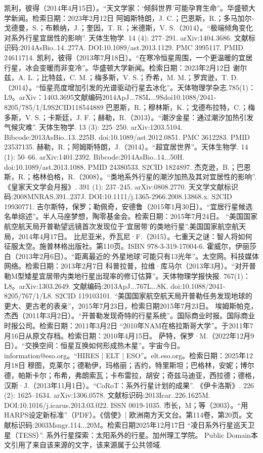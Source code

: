 \begin{enumerate}
 凯利，彼得（2014年4月15日）。“天文学家：‘倾斜世界’可能孕育生命”。华盛顿大学新闻。检索日期：2023年2月12日
 阿姆斯特朗，J. C.；巴恩斯，R.；多马加尔-戈德曼，S.；布赖纳，J.；奎因，T. R.；米德斯，V. S.（2014）。“极端倾角变化对系外行星宜居性的影响”. 天体生物学. 14 (4): 277–291. arXiv:1404.3686. 文献标识码:2014AsBio..14..277A. DOI:10.1089/ast.2013.1129. PMC 3995117. PMID 24611714.
 凯利，彼得（2013年7月18日）。“在寒冷恒星周围，一个更温暖的宜居行星，冰会变暖而非变冷”。华盛顿大学新闻。检索日期：2023年2月12日
 谢尔兹，A. L.；比特兹，C. M.；梅多斯，V. S.；乔希，M. M.；罗宾逊，T. D.（2014）。“恒星亮度增加引发的光谱驱动行星去冰化”。天体物理学杂志.785(1)：L9。arXiv：1403.3695文献编码2014ApJ...785L...9Sdoi10.1088/2041-8205/785/1/L9S2CID118544889
 巴恩斯，R.；穆林斯，K.；戈德布拉特，C.；梅多斯，V. S.；卡斯廷，J. F.；赫勒，R.（2013）。“潮汐金星：通过潮汐加热引发气候灾难”. 天体生物学. 13 (3): 225–250. arXiv:1203.5104. Bibcode:2013AsBio..13..225B. doi:10.1089/ast.2012.0851. PMC 3612283. PMID 23537135.
 赫勒，R.；阿姆斯特朗，J.（2014）。“超宜居世界”。天体生物学. 14 (1): 50–66. arXiv:1401.2392. Bibcode:2014AsBio..14...50H. doi:10.1089/ast.2013.1088. PMID 24380533. S2CID 1824897.
 杰克逊，B.；巴恩斯，R.；格林伯格，R.（2008）。“类地系外行星的潮汐加热及其对宜居性的影响”. 《皇家天文学会月报》. 391 (1): 237–245. arXiv:0808.2770. 天文学文献标识码:2008MNRAS.391..237J. DOI:10.1111/j.1365-2966.2008.13868.x. S2CID 19930771.
 吉尔斯特，保罗；勒佩奇，安德鲁（2015年1月30日）。“宜居行星候选名单综述”。半人马座梦想，陶零基金会。检索日期：2015年7月24日。
 “美国国家航空航天局开普勒望远镜首次发现位于‘宜居带’的类地行星”.美国国家航空航天局，2014年4月17日。
 比尼亚米，乔瓦尼·F.（2015）。七重天之谜：智人将如何征服太空。施普林格出版社。第110页。ISBN 978-3-319-17004-6.
 霍威尔，伊丽莎白（2013年2月6日）。“距离最近的‘外星地球’可能只有13光年”。太空网。科技媒体网络。检索日期：2013年2月7日
 科普拉普，拉维·库马尔（2013年3月）。“对开普勒M型矮星宜居带内类地行星出现率的修订估算”。天体物理学报快报. 767(1)：L8。arXiv:1303.2649. 文献编码:2013ApJ...767L...8K. doi:10.1088/2041-8205/767/1/L8. S2CID 119103101.
 “美国国家航空航天局开普勒任务发现地球的更大、更古老的表亲”，2015年7月23日，检索日期2015年7月23日。
 埃姆斯帕克，杰西（2011年3月2日）。“开普勒发现奇特的行星系统”。国际商业时报。国际商业时报公司。检索日期：2011年3月2日
 “2010年NAM在格拉斯哥大学”。于2011年7月16日从原文存档。检索日期：2010年4月15日。
 萨特，保罗·M.（2022年12月9日）。“交换空间：恒星互换如何形成热木星”。宇宙今日。
 information@eso.org。“HIRES | ELT | ESO”。elt.eso.org。检索日期：2025年12月18日
 穆图，克莱尔；德勒伊，玛格丽；吉约，特里斯坦；巴格林，安妮；博尔德，帕斯卡尔；布希，弗朗索瓦；卡布雷拉，胡安；奇兹马迪亚，西拉德；德格，汉斯·J.（2013年11月1日）。“CoRoT：系外行星计划的成果”. 《伊卡洛斯》. 226 (2): 1625–1634. arXiv:1306.0578. 文献标识码:2013Icar..226.1625M. DOI:10.1016/j.icarus.2013.03.022. ISSN 0019-1035.
 市长，M；等（2003）。“用HARPS设定新标准”（PDF）。《信使》| 欧洲南方天文台。第114卷，第20页。文献标识码:2003Msngr.114...20M。检索日期2025年12月17日
 “凌日系外行星巡天卫星（TESS）”. 系外行星探索：太阳系外的行星。加州理工学院。 Public Domain本文引用了来自该来源的文字，该来源属于公共领域.
 \end{enumerate}
